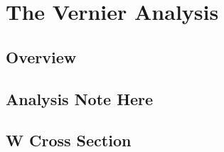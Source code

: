 \chapter{The Vernier Analysis}
\section{Overview}
\section{Analysis Note Here}
\section{W Cross Section}
